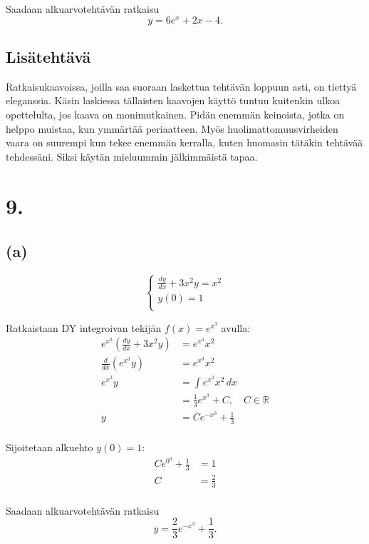 \documentclass{article}
\begin{document}
Saadaan alkuarvotehtävän ratkaisu
\[
  y = 6e^x + 2x - 4.
\]

\subsection*{Lisätehtävä}

Ratkaisukaavoissa, joilla saa suoraan laskettua tehtävän loppuun asti, on
tiettyä eleganssia. Kä\-sin laskiessa tällaisten kaavojen käyttö tuntuu
kuitenkin ulkoa opettelulta, jos kaava on monimutkainen. Pidän enemmän
keinoista, jotka on helppo muistaa, kun ymmärtää periaatteen. Myös
huolimattomuusvirheiden vaara on suurempi kun tekee enemmän kerralla, kuten
huomasin tätäkin tehtävää tehdessäni. Siksi käytän mieluummin jälkimmäistä
tapaa.

\section*{9.}

\subsection*{(a)}

\[
  \begin{cases}
    \frac{dy}{dx} + 3x^2y = x^2 \\
    y(0) = 1 \\
  \end{cases}
\]

Ratkaistaan DY integroivan tekijän $f(x) = e^{x^3}$ avulla:
\begin{align*}
  e^{x^3}(\frac{dy}{dx} + 3x^2y) &= e^{x^3}x^2 \\
  \frac{d}{dx}(e^{x^3}y) &= e^{x^3}x^2 \\
  e^{x^3}y &= \int e^{x^3}x^2\,dx \\
           &= \frac{1}{3}e^{x^3} + C, \quad C \in \mathbb{R} \\
  y &= Ce^{-x^3} + \frac{1}{3} \\
\end{align*}

Sijoitetaan alkuehto $y(0) = 1$:
\begin{align*}
  Ce^{0^3} + \frac{1}{3} &= 1 \\
  C &= \frac{2}{3} \\
\end{align*}

Saadaan alkuarvotehtävän ratkaisu
\[
  y = \frac{2}{3}e^{-x^3} + \frac{1}{3}.
\]
\end{document}
